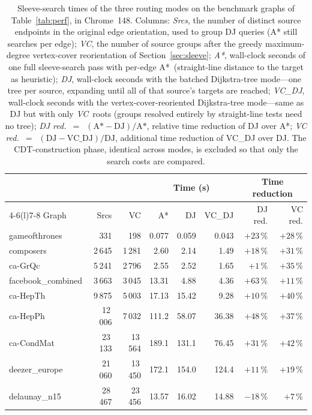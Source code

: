 \documentclass[review]{vgtc}          %
\begin{document}
\begin{table}[t]
  \caption{Sleeve-search times of the three routing modes on the
    benchmark graphs of Table~\ref{tab:perf}, in
    Chrome~148. Columns: \emph{Srcs}, the number of distinct source
    endpoints in the original edge orientation, used to group DJ
    queries (A* still searches per edge); \emph{VC}, the number of
    source groups after the greedy maximum-degree vertex-cover
    reorientation of Section~\ref{sec:sleeve}; \emph{A*}, wall-clock
    seconds of one full sleeve-search pass with per-edge A*\
    (straight-line distance to the target as heuristic);
    \emph{DJ}, wall-clock seconds with the batched Dijkstra-tree
    mode---one tree per source, expanding until all of that source's
    targets are reached; \emph{VC\_DJ}, wall-clock seconds with the
    vertex-cover-reoriented Dijkstra-tree mode---same as DJ but with
    only \emph{VC}~roots (groups resolved entirely by straight-line
    tests need no tree); \emph{DJ red.}~$=$~$(\text{A*}-\text{DJ})/\text{A*}$,
    relative time reduction of DJ over A*; \emph{VC red.}~$=$~$(\text{DJ}-\text{VC\_DJ})/\text{DJ}$,
    additional time reduction of VC\_DJ over DJ. The CDT-construction phase,
    identical across modes, is excluded so that only the search costs
    are compared.}
  \label{tab:routing-modes}
  \centering
  \scriptsize
  \setlength{\tabcolsep}{1.8pt}
  \begin{tabular}{@{}lrrrrrrr@{}}
    \toprule
    & & & \multicolumn{3}{c}{Time (s)} & \multicolumn{2}{c}{Time reduction} \\
    \cmidrule(lr){4-6}\cmidrule(l){7-8}
    Graph & Srcs & VC & A* & DJ & VC\_DJ & DJ red. & VC red. \\
    \midrule
    gameofthrones      &     331 &     198 &   0.077 &   0.059 &   0.043 & $+23$\,\% & $+28$\,\% \\
    composers          &  2\,645 &  1\,281 &   2.60  &   2.14  &   1.49  & $+18$\,\% & $+31$\,\% \\
    ca-GrQc            &  5\,241 &  2\,796 &   2.55  &   2.52  &   1.65  &  $+1$\,\% & $+35$\,\% \\
    facebook\_combined &  3\,663 &  3\,045 &  13.31  &   4.88  &   4.36  & $+63$\,\% & $+11$\,\% \\
    ca-HepTh           &  9\,875 &  5\,003 &  17.13  &  15.42  &   9.28  & $+10$\,\% & $+40$\,\% \\
    ca-HepPh           & 12\,006 &  7\,032 & 111.2   &  58.07  &  36.38  & $+48$\,\% & $+37$\,\% \\
    ca-CondMat         & 23\,133 & 13\,564 & 189.1   & 131.1   &  76.45  & $+31$\,\% & $+42$\,\% \\
    deezer\_europe     & 21\,060 & 13\,450 & 172.1   & 154.0   & 124.4   & $+11$\,\% & $+19$\,\% \\
    delaunay\_n15      & 28\,467 & 23\,456 &  13.57  &  16.02  &  14.88  & $-18$\,\% &  $+7$\,\% \\
    \bottomrule
  \end{tabular}
\end{table}
\end{document}
